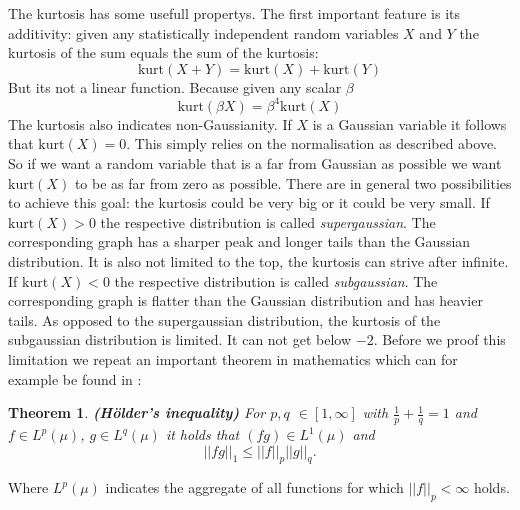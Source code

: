 \documentclass[12pt, a4paper]{article}
\newtheorem{Theorem}{Theorem}[section]
\numberwithin{equation}{section}
\numberwithin{figure}{section}
\numberwithin{table}{section}
\newcommand{\kurt}{\mathrm{kurt}}
\begin{document}
	The kurtosis has some usefull propertys.
	The first important feature is its additivity: given any statistically independent random variables $X$ and $Y$ the kurtosis of the sum equals the sum of the kurtosis:
	\begin{equation}
	\kurt (X+Y)= \kurt (X)+\kurt (Y)
	\end{equation}
	But its not a linear function. Because given any scalar \mbox{$\beta$}
	\begin{equation}
	\kurt(\beta X) = \beta^4 \kurt(X)
	\end{equation}
	The kurtosis also indicates non-Gaussianity. If $X$ is a Gaussian variable it follows that \mbox{$\kurt(X) = 0$}.
	This simply relies on the normalisation as described above.
	So if we want a random variable that is a far from Gaussian as possible we want \mbox{$\kurt(X)$} to be as far from zero as possible.
	There are in general two possibilities to achieve this goal: the kurtosis could be very big or it could be very small.
	If \mbox{$\kurt(X)>0$} the respective distribution is called \textit{supergaussian}.
	The corresponding graph has a sharper peak and longer tails than the Gaussian distribution.
	It is also not limited to the top, the kurtosis can strive after infinite.
	If \mbox{$\kurt(X)<0$} the respective distribution is called \textit{subgaussian}.
	The corresponding graph is flatter than the Gaussian distribution and has heavier tails.
	As opposed to the supergaussian distribution, the kurtosis of the subgaussian distribution is limited.
	It can not get below \mbox{$-2$}.
	Before we proof this limitation we repeat an important theorem in mathematics which can for example be found in \citet{wtheorie} :
	\begin{Theorem} \label{hoelder-theorem} \textbf{(Hölder's inequality)}
		For $p,q$ $\in \left[ 1,\infty\right]$ with $\frac{1}{p}+\frac{1}{q}=1$ and $f \in L^p(\mu)$, $g \in L^q(\mu)$ it holds that $(fg) \in L^1(\mu)$ and
		\begin{equation}\label{hoelder-inequality}
		\vert \vert fg \vert \vert _1 \leq \vert \vert f \vert \vert _p \vert \vert g \vert \vert _q.
		\end{equation}
	\end{Theorem}
	Where \mbox{$L^p(\mu)$} indicates the aggregate of all functions for which \mbox{$\vert \vert f \vert \vert _p < \infty$} holds.
	
\end{document}
